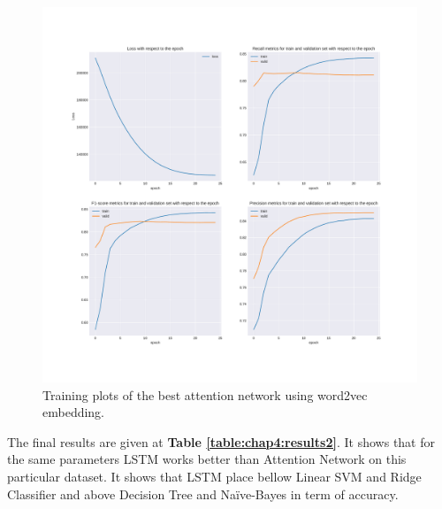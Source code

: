 \begin{figure}
	\centering
	\includegraphics[width=\textwidth]{images/chapitre4/attention5}
	\caption{Training plots of the best attention network using word2vec embedding.}
	\label{chap4:fig:attention5}
\end{figure} 

The final results are given at \textbf{Table \ref{table:chap4:results2}}. It shows that for the same parameters LSTM works better than Attention Network on this particular dataset. It shows that LSTM place bellow Linear SVM and Ridge Classifier and above Decision Tree and Na\"{i}ve-Bayes in term of accuracy. 

